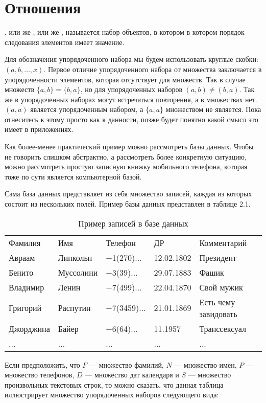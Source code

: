 \section{Отношения}

\begin{definition}
, или же , или же , называется набор объектов, в котором в котором порядок следования элементов имеет значение.
\end{definition}

Для обозначения упорядоченного набора мы будем использовать круглые скобки: $(a, b, \ldots, x)$. Первое отличие упорядоченного набора от множества заключается в упорядоченности элементов, которая отсутствует для множеств. Так в случае множеств $\{a, b\} = \{b, a\}$, но для упорядоченных наборов $(a, b)\not=(b, a)$. Так же в упорядоченных наборах могут встречаться повторения, а в множествах нет. $(a, a)$ является упорядоченным набором, а $\{a, a\}$ множеством не является. Пока отнеситесь к этому просто как к данности, позже будет понятно какой смысл это имеет в приложениях.

Как более-менее практический пример можно рассмотреть базы данных. Чтобы не говорить слишком абстрактно, а рассмотреть более конкретную ситуацию, можно рассмотреть простую записную книжку мобильного телефона, которая тоже по сути является компьютерной базой.

Сама база данных представляет из себя множество записей, каждая из которых состоит из нескольких полей. Пример базы данных представлен в таблице 2.1.

\begin{table}[h]
\centering
\begin{tabular}{lllll}
Фамилия & Имя & Телефон & ДР & Комментарий\\
Авраам & Линкольн & +1(270)... & 12.02.1802 & Президент\\
Бенито & Муссолини & +3(39)... & 29.07.1883 & Фашик\\
Владимир & Ленин & +7(499)... & 22.04.1870 & Свой мужик\\
Григорий & Распутин & +7(3459)... & 21.01.1869 & Есть чему завидовать\\
Джорджина & Байер & +6(64)... & 11.1957 & Транссексуал\\
... & ... & ... & ... & ...
\end{tabular}
\caption{Пример записей в базе данных}
\end{table}

Если предположить, что $F$ — множество фамилий, $N$ — множество имён, $P$ — множество телефонов, $D$ — множество дат календаря и $S$ — множество произвольных текстовых строк, то можно сказать, что данная таблица иллюстрирует множество упорядоченных наборов следующего вида:

